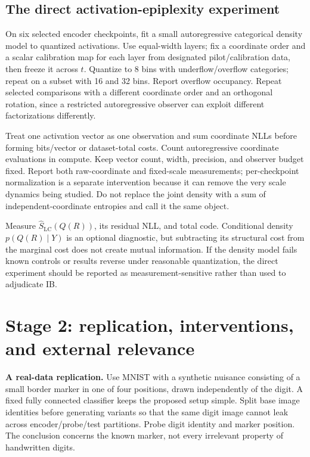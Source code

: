 \documentclass[11pt,a4paper]{article}
\begin{document}
\subsection{The direct activation-epiplexity experiment}
On six selected encoder checkpoints, fit a small autoregressive categorical density model to quantized activations. Use equal-width layers; fix a coordinate order and a scalar calibration map for each layer from designated pilot/calibration data, then freeze it across $t$. Quantize to 8 bins with underflow/overflow categories; repeat on a subset with 16 and 32 bins. Report overflow occupancy. Repeat selected comparisons with a different coordinate order and an orthogonal rotation, since a restricted autoregressive observer can exploit different factorizations differently.

Treat one activation vector as one observation and sum coordinate NLLs before forming bits/vector or dataset-total costs. Count autoregressive coordinate evaluations in compute. Keep vector count, width, precision, and observer budget fixed. Report both raw-coordinate and fixed-scale measurements; per-checkpoint normalization is a separate intervention because it can remove the very scale dynamics being studied. Do not replace the joint density with a sum of independent-coordinate entropies and call it the same object.

Measure $\widehat S_{\mathrm{LC}}(Q(R))$, its residual NLL, and total code. Conditional density $p(Q(R)\mid Y)$ is an optional diagnostic, but subtracting its structural cost from the marginal cost does not create mutual information. If the density model fails known controls or results reverse under reasonable quantization, the direct experiment should be reported as measurement-sensitive rather than used to adjudicate IB.

\section{Stage 2: replication, interventions, and external relevance}

\textbf{A real-data replication.} Use MNIST with a synthetic nuisance consisting of a small border marker in one of four positions, drawn independently of the digit. A fixed fully connected classifier keeps the proposed setup simple. Split base image identities before generating variants so that the same digit image cannot leak across encoder/probe/test partitions. Probe digit identity and marker position. The conclusion concerns the known marker, not every irrelevant property of handwritten digits.
\end{document}

